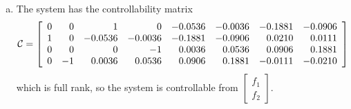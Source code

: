 \documentclass{article}
\begin{document}
\begin{enumerate}[(a)]
  \item{
    The system has the controllability matrix
    $$
    \mathcal{C} =
    \left[\begin{array}{r r r r r r r r}
         0 &  0 &       1 &       0 & -0.0536 & -0.0036 & -0.1881 & -0.0906 \\
         1 &  0 & -0.0536 & -0.0036 & -0.1881 & -0.0906 &  0.0210 &  0.0111 \\
         0 &  0 &       0 &      -1 &  0.0036 &  0.0536 &  0.0906 &  0.1881 \\
         0 & -1 &  0.0036 &  0.0536 &  0.0906 &  0.1881 & -0.0111 & -0.0210
    \end{array}\right]
    $$
    which is full rank, so the system is controllable from
    $\left[\begin{array}{c} f_1 \\ f_2 \end{array}\right]$.

}
\end{enumerate}
\end{document}
